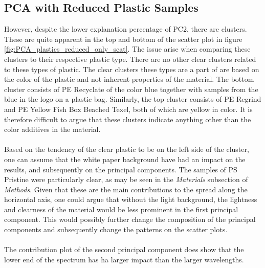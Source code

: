 \subsection{PCA with Reduced Plastic Samples}
However, despite the lower explanation percentage of PC2, there are clusters. These are quite apparent in the top and bottom of the scatter plot in figure \ref{fig:PCA_plastics_reduced_only_scat}. The issue arise when comparing these clusters to their respective plastic type. There are no other clear clusters related to these types of plastic. The clear clusters these types are a part of are based on the color of the plastic and not inherent properties of the material. The bottom cluster consists of PE Recyclate of the color blue together with samples from the blue in the logo on a plastic bag. Similarly, the top cluster consists of PE Regrind and PE Yellow Fish Box Beached Texel, both of which are yellow in color. It is therefore difficult to argue that these clusters indicate anything other than the color additives in the material.
\\\\
Based on the tendency of the clear plastic to be on the left side of the cluster, one can assume that the white paper background have had an impact on the results, and subsequently on the principal components. The samples of PS Pristine were particularly clear, as may be seen in the \textit{Materials} subsection of \textit{Methods}. Given that these are the main contributions to the spread along the horizontal axis, one could argue that without the light background, the lightness and clearness of the material would be less prominent in the first principal component. This would possibly further change the composition of the principal components and subsequently change the patterns on the scatter plots. 
\\\\%
\noindent
The contribution plot of the second principal component does show that the lower end of the spectrum has ha larger impact than the larger wavelengths. 

